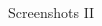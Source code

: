 \documentclass{beamer}
\begin{document}
\begin{frame}{Screenshots II}
\begin{columns}[onlytextwidth]
\begin{column}{0.5\textwidth}
			\end{column}
			\begin{column}{0.5\textwidth}
				\centering
			\end{column}
		\end{columns}
	\end{frame}
	
\end{document}
